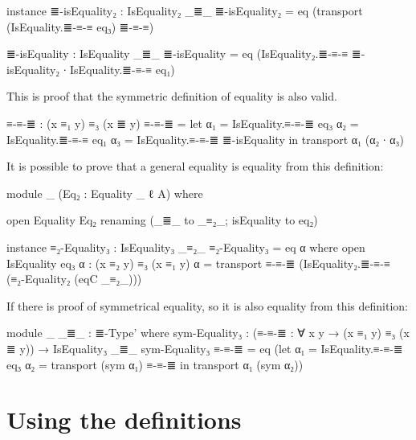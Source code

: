 \documentclass{article}
\begin{document}
\begin{code}
        instance
          ≣-isEquality₂ : IsEquality₂ _≣_
          ≣-isEquality₂ = eq (transport (IsEquality.≣-≡-≡ eq₃) ≣-≡-≡)

          ≣-isEquality : IsEquality _≣_
          ≣-isEquality = eq (IsEquality₂.≣-≡-≡ ≣-isEquality₂ ∙ IsEquality.≣-≡-≡ eq₁)

\end{code}

This is proof that the symmetric definition of equality is also valid.

\begin{code}
        ≡-≡-≣ : (x ≡₁ y) ≡₃ (x ≣ y)
        ≡-≡-≣ = let
          α₁ = IsEquality.≡-≡-≣ eq₃
          α₂ = IsEquality.≣-≡-≡ eq₁
          α₃ = IsEquality.≡-≡-≣ ≣-isEquality
          in transport α₁ (α₂ ∙ α₃)
\end{code}

It is possible to prove that a general equality is equality from this definition:

\begin{code}
      module _
        (Eq₂ : Equality {_} {ℓ} {A})
        where

        open Equality Eq₂ renaming (_≣_ to _≡₂_; isEquality to eq₂)

        instance
          ≡₂-Equality₃ : IsEquality₃ _≡₂_
          ≡₂-Equality₃ = eq α
            where
              open IsEquality eq₃
              α : (x ≡₂ y) ≡₃ (x ≡₁ y)
              α = transport ≡-≡-≣ (IsEquality₂.≣-≡-≡ (≡₂-Equality₂ (eqC _≡₂_)))

\end{code}

If there is proof of symmetrical equality, so it is also equality from this definition:

\begin{code}

      module _ {_≣_ : ≣-Type'} where
        sym-Equality₃ :
          (≡-≡-≣ : ∀ {x y} → (x ≡₁ y) ≡₃ (x ≣ y))
          → IsEquality₃ _≣_
        sym-Equality₃ ≡-≡-≣ = eq (let
          α₁ = IsEquality.≡-≡-≣ eq₃
          α₂ = transport (sym α₁) ≡-≡-≣
          in transport α₁ (sym α₂))

\end{code}

\section{Using the definitions}
\end{document}
